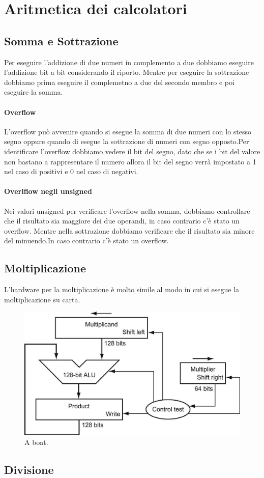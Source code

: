 \section{Aritmetica dei calcolatori}

\subsection{Somma e Sottrazione}
Per eseguire l'addizione di due numeri in complemento 
a due dobbiamo eseguire l'addizione bit a bit considerando il riporto.
Mentre per eseguire la sottrazione dobbiamo prima eseguire il complemetno 
a due del secondo membro e poi eseguire la somma.
\paragraph{Overflow}
L'overflow può avvenire quando si esegue la somma di due 
numeri con lo stesso segno oppure quando di esegue la sottrazione di 
numeri con segno opposto.Per identificare l'overflow dobbiamo vedere il 
bit del segno, dato che se i bit del valore non bastano a rappresentare il numero
allora il bit del segno verrà impostato a 1 nel caso di positivi e 0 nel caso di negativi.

\paragraph{Overlflow negli unsigned}
Nei valori unsigned per verificare l'overflow nella somma,
dobbiamo controllare che il risultato sia maggiore dei due
operandi, in caso contrario c'è stato un overflow.
Mentre nella sottrazione dobbiamo verificare che il 
risultato sia minore del minuendo.In caso contrario c'è stato un overflow.
\subsection{Moltiplicazione}

L'hardware per la moltiplicazione è molto simile al modo in cui si esegue la moltiplicazione su carta.

\begin{figure}[H]
    \includegraphics[width=\linewidth]{pictures/schemaMoltiplicazione.png}
    \caption{A boat.}
    \label{fig:boat1}
  \end{figure}


\subsection{Divisione}
